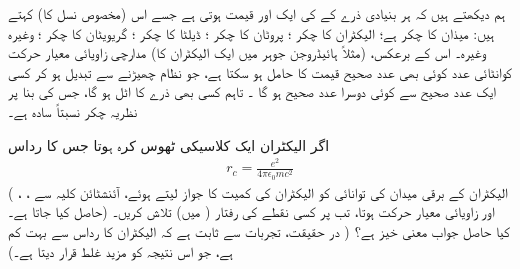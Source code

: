  ہم دیکھتے ہیں کہ ہر بنیادی ذرے کے  کی ایک  اور  قیمت ہوتی ہے جسے اس (مخصوص نسل کا)   کہتے ہیں:   میذان  کا چکر  ہے؛  الیکٹران کا چکر ؛  پروٹان کا چکر ؛  ڈیلٹا کا چکر ؛  گریویٹان کا چکر ؛  وغیرہ وغیرہ۔ اس کے برعکس، (مثلاً   ہائیڈروجن جوہر میں ایک الیکٹران کا) مدارچی زاویائی معیار حرکت کوانٹائی عدد  کوئی بھی عدد صحیح قیمت  کا حامل ہو  سکتا ہے، جو نظام چھیڑنے سے تبدیل ہو کر کسی ایک  عدد  صحیح سے کوئی  دوسرا عدد صحیح  ہو گا ۔ تاہم کسی بھی ذرے کا  اٹل ہو گا،  جس کی بنا پر نظریہ چکر نسبتاً  سادہ ہے۔ 

اگر الیکٹران ایک کلاسیکی ٹھوس کرہ ہوتا جس کا رداس 
\begin{align}
r_c = \frac{e^2}{4 \pi \epsilon_0 m c ^2}
\end{align}
(  الیکٹران کے برقی میدان کی توانائی کو الیکٹران کی کمیت کا جواز لیتے ہوئے،  آئنشٹائن کلیہ   سے   ، ،   حاصل کیا جاتا ہے۔) اور    زاویائی معیار حرکت  ہوتا، تب     پر کسی 
نقطے کی رفتار (  میں)  تلاش کریں۔ کیا حاصل جواب معنی خیز ہے؟  ( در حقیقت،  تجربات سے ثابت  ہے کہ الیکٹران کا رداس  سے بہت کم ہے،  جو اس نتیجہ کو  مزید غلط قرار   دیتا ہے۔) 


